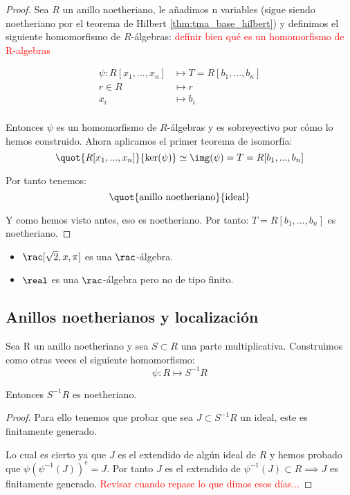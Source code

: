 \begin{proof}
	Sea $R$ un anillo noetheriano, le añadimos n variables (sigue siendo noetheriano por el teorema de Hilbert \ref{thm:tma_base_hilbert}) y definimos el siguiente homomorfismo de $R$-álgebras: \textcolor{red}{definir bien qué es un homomorfismo de R-algebras}

	\begin{align*}
		\psi: R[x_1,...,x_n] & \longmapsto  T=R[b_1,...,b_n]\\
		r \in R & \longmapsto r \\
		x_i & \longmapsto b_i \\
	\end{align*}

	Entonces $\psi$ es un homomorfismo de $R$-álgebras y es sobreyectivo por cómo lo hemos construido. Ahora aplicamos el primer teorema de isomorfía:
	$$ \quot{R[x_1,...,x_n]}{\ker(\psi)} \simeq \img(\psi)=T=R[b_1,...,b_n]$$

	Por tanto tenemos:
	 $$\quot{\text{anillo noetheriano}}{\text{ideal}}$$

	Y como hemos visto antes, eso es noetheriano. Por tanto: $T=R[b_1,...,b_n]$ es noetheriano.
\end{proof}

\begin{example}
	\begin{itemize}
		\item $\rac[\sqrt{2},x, \pi]$ es una $\rac$-álgebra.
		\item $\real$ es una $\rac$-álgebra pero no de tipo finito.
	\end{itemize}
\end{example}

\subsection{Anillos noetherianos y localización}

\begin{prop} \label{prop:NoetherianoLocalizacion}
	Sea R un anillo noetheriano y sea $S\subset R$ una parte multiplicativa. Construimos como otras veces el siguiente homomorfismo:
	$$\psi: R \longmapsto S^{-1}R$$

	Entonces $S^{-1}R$ es noetheriano.
\end{prop}
\begin{proof}
	Para ello tenemos que probar que sea $J \subset S^{-1}R$ un ideal, este es finitamente generado.

	Lo cual es cierto ya que $J$ es el extendido de algún ideal de $R$ y hemos probado que $\psi(\psi^{-1}(J))^e=J$. Por tanto $J$ es el extendido de $\psi^{-1}(J)\subset R \implies J$ es finitamente generado. \textcolor{red}{Revisar cuando repase lo que dimos esos días...} %
\end{proof}


